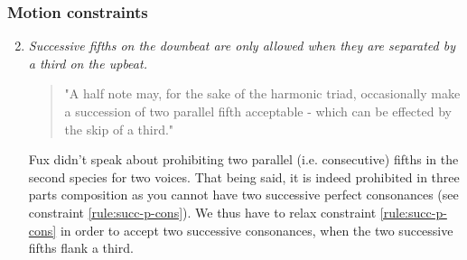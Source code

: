 \subsubsection{Motion constraints}
\begin{enumerate}[wide, label=\bfseries 2.P\arabic*]
\setcounter{enumi}{1} %
    \item \textit{Successive fifths on the downbeat are only allowed when they are separated by a third on the upbeat.} \label{rule:succ-fifths-flanking-third}    
    \begin{quotation}
        "A half note may, for the sake of the harmonic triad, occasionally make a succession of two parallel fifth acceptable - which can be effected by the skip of a third."
        \textcite[p.86]{GaPEng}
    \end{quotation}
    Fux didn't speak about prohibiting two parallel (i.e. consecutive) fifths in the second species for two voices. That being said, it is indeed prohibited in three parts composition as you cannot have two successive perfect consonances (see constraint \ref{rule:succ-p-cons}). We thus have to relax constraint \ref{rule:succ-p-cons} in order to accept two successive consonances, when the two successive fifths flank a third.


\end{enumerate}
